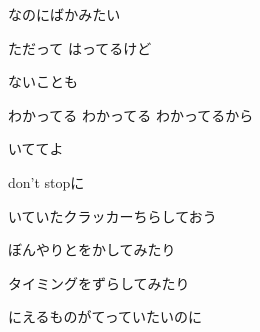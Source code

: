 \documentclass[a4paper,tate,twocolumn,12pt]{ltjtarticle}
\begin{document}
\begin{flushleft}
\begin{minipage}{\linewidth}
なのにばかみたい

ただって はってるけど

ないことも

わかってる わかってる わかってるから

いててよ

don't stopに

いていたクラッカーちらしておう
\end{minipage}

\vspace{2em}

\noindent\begin{minipage}{\linewidth}
ぼんやりとをかしてみたり

タイミングをずらしてみたり

にえるものがてっていたいのに
\end{minipage}

\end{flushleft}
\end{document}
